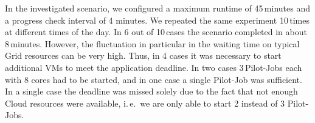 \documentclass[conference,final]{IEEEtran}
\newcommand{\up}{\vspace*{-1em}}
\newcommand{\alnote}[1]{ {\textcolor{blue} { ***AL: #1 }}}
\newcommand{\jhanote}[1]{ {\textcolor{red} { ***SJ: #1 }}}
\newcommand{\alnote}[1]{}
\newcommand{\jhanote}[1]{}
\begin{document}
In the investigated scenario, we configured a maximum runtime of
45\,minutes and a progress check interval of 4 minutes. We repeated
the same experiment 10\,times at different times of the day. In 6 out
of 10\,cases the scenario completed in about 8\,minutes. However, the
fluctuation in particular in the waiting time on typical Grid
resources can be very high. Thus, in 4 cases it was necessary to start
additional VMs to meet the application deadline.  In two cases
3\,Pilot-Jobs each with 8 cores had to be started, and in one case a
single Pilot-Job was sufficient.  In a single case the deadline was
missed solely due to the fact that not enough Cloud resources were
available, i.\,e.\ we are only able to start 2 instead of 3
Pilot-Jobs.





\end{document}
